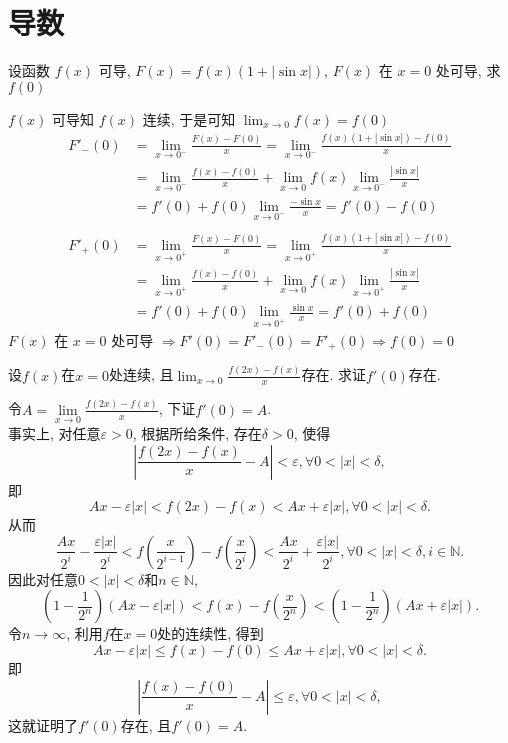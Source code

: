 \documentclass[color=green,titlestyle=hang]{elegantbook}%
\begin{document}
\chapter{导数}

\begin{example}
设函数 $f(x)$ 可导, $F(x)=f(x)(1+|\sin x|)$, $F(x)$ 在 $x=0$ 处可导, 求 $f(0)$
\end{example}\begin{Solution}
$f(x)$ 可导知 $f(x)$ 连续, 于是可知 $\lim_{x\to0}f(x)=f(0)$ 
\begin{align*}
F'_{-}(0)&=\lim_{x\to0^-}\frac{F(x)-F(0)}{x}=\lim_{x\to0^-}\frac{f(x)(1+|\sin x|)-f(0)}{x}\\
&=\lim_{x\to0^-}\frac{f(x)-f(0)}{x}+\lim_{x\to0}f(x)\lim_{x\to0^-}\frac{|\sin x|}{x}\\
&=f'(0)+f(0)\lim_{x\to0^-}\frac{-\sin x}{x}=f'(0)-f(0)\\[-3em]
\end{align*}\begin{align*}
F'_{+}(0)&=\lim_{x\to0^+}\frac{F(x)-F(0)}{x}=\lim_{x\to0^+}\frac{f(x)(1+|\sin x|)-f(0)}{x}\\
&=\lim_{x\to0^+}\frac{f(x)-f(0)}{x}+\lim_{x\to0}f(x)\lim_{x\to0^+}\frac{|\sin x|}{x}\\
&=f'(0)+f(0)\lim_{x\to0^+}\frac{\sin x}{x}=f'(0)+f(0)
\end{align*}
$F(x)$ 在 $x=0$ 处可导 $\Longrightarrow F'(0)=F'_{-}(0)=F'_{+}(0)\Longrightarrow f(0)=0$
\end{Solution}

\begin{exercise}
设$f(x)$在$x=0$处连续, 且$\displaystyle\lim_{x\to 0} \frac{f(2x)-f(x)}{x}$存在. 求证$f'(0)$存在.	
\end{exercise}\begin{solution}
令$A=\lim\limits_{x\to 0}\frac{f(2x)-f(x)}{x}$, 下证$f'(0)=A$. \\
事实上, 对任意$\varepsilon>0$, 根据所给条件, 存在$\delta>0$, 使得
\[\left|\frac{f(2x)-f(x)}{x}-A\right|<\varepsilon, \forall 0<|x|<\delta,\]
即
\[Ax-\varepsilon |x|<f(2x)-f(x)<Ax+\varepsilon|x|,\forall 0<|x|<\delta.\]
从而
\[\frac{Ax}{2^i}- \frac{\varepsilon|x|}{2^i}<f\left(\frac{x}{2^{i-1}}\right)-f\left(\frac{x}{2^i}\right)<\frac{Ax}{2^i}+ \frac{\varepsilon|x|}{2^i},\forall
0<|x|<\delta,i\in\mathbb N.\]
因此对任意$0<|x|<\delta$和$n\in\mathbb N$,
\[\left(1-\frac{1}{2^n}\right)(Ax-\varepsilon |x|)<f(x)-f\left(\frac{x}{2^n}\right)<\left(1-\frac{1}{2^n}\right)(Ax+\varepsilon |x|).
\]
令$n\to\infty$, 利用$f$在$x=0$处的连续性, 得到
\[Ax-\varepsilon |x|\leqslant f(x)-f(0)\leqslant Ax+\varepsilon |x|,\forall 0<|x|<\delta.
\]
即
\[\left|\frac{f(x)-f(0)}{x}-A\right|\leqslant \varepsilon,\forall 0<|x|<\delta,\]
这就证明了$f'(0)$存在, 且$f'(0)=A$.	
\end{solution}
\end{document}
